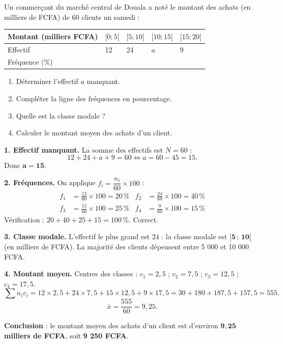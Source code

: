 \documentclass[11pt]{article}
\begin{document}
\begin{exoresolu}
Un commerçant du marché central de Douala a noté le montant des achats (en milliers de FCFA) de 60 clients un samedi :
\begin{center}
\begin{tabularx}{\linewidth}{|l|X|X|X|X|}\hline
\rowcolor{popblueL} Montant (milliers FCFA) & $[0;5[$ & $[5;10[$ & $[10;15[$ & $[15;20[$ \\ \hline
Effectif & 12 & 24 & $a$ & 9 \\ \hline
Fréquence (\%) & & & & \\ \hline
\end{tabularx}
\end{center}
\begin{enumerate}
\item Déterminer l'effectif $a$ manquant.
\item Compléter la ligne des fréquences en pourcentage.
\item Quelle est la classe modale ?
\item Calculer le montant moyen des achats d'un client.
\end{enumerate}
\tcblower
\textbf{1. Effectif manquant.} La somme des effectifs est $N = 60$ :
\[12 + 24 + a + 9 = 60 \iff a = 60 - 45 = 15.\]
Donc $\mathbf{a = 15}$.

\textbf{2. Fréquences.} On applique $f_i = \dfrac{n_i}{60} \times 100$ :
\begin{align*}
f_1 &= \frac{12}{60}\times 100 = 20\,\% &
f_2 &= \frac{24}{60}\times 100 = 40\,\% \\
f_3 &= \frac{15}{60}\times 100 = 25\,\% &
f_4 &= \frac{9}{60}\times 100 = 15\,\%
\end{align*}
Vérification : $20 + 40 + 25 + 15 = 100\,\%$. Correct.

\textbf{3. Classe modale.} L'effectif le plus grand est $24$ : la classe modale est $\mathbf{[5\,;\,10[}$ (en milliers de FCFA). La majorité des clients dépensent entre 5 000 et 10 000 FCFA.

\textbf{4. Montant moyen.} Centres des classes : $c_1 = 2{,}5$ ; $c_2 = 7{,}5$ ; $c_3 = 12{,}5$ ; $c_4 = 17{,}5$.
\[\sum n_i c_i = 12 \times 2{,}5 + 24 \times 7{,}5 + 15 \times 12{,}5 + 9 \times 17{,}5 = 30 + 180 + 187{,}5 + 157{,}5 = 555.\]
\[\bar{x} = \frac{555}{60} = 9{,}25.\]

\textbf{Conclusion} : le montant moyen des achats d'un client est d'environ $\mathbf{9{,}25}$ \textbf{milliers de FCFA}, soit \textbf{9 250 FCFA}.
\end{exoresolu}
\end{document}
